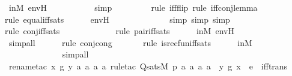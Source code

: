 \begin{isabellebody}
\ inM\ envH\ \isanewline
\ \ \ \ \ \ \ \ \isamarkupfalse%
\ simp\ \isanewline
\ \ \ \ \ \ \ \isamarkupfalse%
{\isacharparenleft}{\kern0pt}rule\ iff{\isacharunderscore}{\kern0pt}flip{\isacharcomma}{\kern0pt}\ rule\ iff{\isacharunderscore}{\kern0pt}conj{\isacharunderscore}{\kern0pt}lemma{\isacharparenright}{\kern0pt}\isanewline
\ \ \ \ \ \ \ \ \ \isamarkupfalse%
{\isacharparenleft}{\kern0pt}rule\ equal{\isacharunderscore}{\kern0pt}iff{\isacharunderscore}{\kern0pt}sats{\isacharparenright}{\kern0pt}\isanewline
\ \ \ \ \isamarkupfalse%
\ envH\ \isanewline
\ \ \ \ \ \ \ \ \ \ \ \isamarkupfalse%
\ {\isacharparenleft}{\kern0pt}simp{\isacharcomma}{\kern0pt}\ simp{\isacharcomma}{\kern0pt}\ simp{\isacharparenright}{\kern0pt}\isanewline
\ \ \ \ \ \ \ \isamarkupfalse%
{\isacharparenleft}{\kern0pt}rule\ conj{\isacharunderscore}{\kern0pt}iff{\isacharunderscore}{\kern0pt}sats{\isacharparenright}{\kern0pt}\ \isanewline
\ \ \ \ \ \ \ \ \ \ \isamarkupfalse%
\ {\isacharparenleft}{\kern0pt}rule\ pair{\isacharunderscore}{\kern0pt}iff{\isacharunderscore}{\kern0pt}sats{\isacharparenright}{\kern0pt}\isanewline
\ \ \ \ \isamarkupfalse%
\ inM\ envH\ \isanewline
\ \ \ \ \ \ \ \ \ \ \ \ \ \ \isamarkupfalse%
\ {\isacharparenleft}{\kern0pt}simp{\isacharunderscore}{\kern0pt}all{\isacharparenright}{\kern0pt}\isanewline
\ \ \ \ \isamarkupfalse%
\ {\isacharparenleft}{\kern0pt}rule\ conj{\isacharunderscore}{\kern0pt}cong{\isacharparenright}{\kern0pt}\isanewline
\ \ \ \ \ \isamarkupfalse%
\ {\isacharparenleft}{\kern0pt}rule\ is{\isacharunderscore}{\kern0pt}recfun{\isacharunderscore}{\kern0pt}iff{\isacharunderscore}{\kern0pt}sats{\isacharparenright}{\kern0pt}\isanewline
\ \ \ \ \isamarkupfalse%
\ inM\ \isanewline
\ \ \ \ \ \ \ \ \ \ \ \ \isamarkupfalse%
\ {\isacharparenleft}{\kern0pt}simp{\isacharunderscore}{\kern0pt}all{\isacharparenright}{\kern0pt}\isanewline
\ \ \ \ \ \isamarkupfalse%
\ {\isacharparenleft}{\kern0pt}rename{\isacharunderscore}{\kern0pt}tac\ x{\isacharprime}{\kern0pt}\ g\ y\ a{}\ a{}\ a{}\ a{}{\isacharcomma}{\kern0pt}\ rule{\isacharunderscore}{\kern0pt}tac\ Q{\isacharequal}{\kern0pt}{\isachardoublequoteopen}sats{\isacharparenleft}{\kern0pt}M{\isacharcomma}{\kern0pt}\ p{\isacharcomma}{\kern0pt}\ {\isacharbrackleft}{\kern0pt}a{}{\isacharcomma}{\kern0pt}\ a{}{\isacharcomma}{\kern0pt}\ a{}{\isacharcomma}{\kern0pt}\ a{}{\isacharbrackright}{\kern0pt}\ {\isacharat}{\kern0pt}\ {\isacharparenleft}{\kern0pt}{\isacharbrackleft}{\kern0pt}y{\isacharcomma}{\kern0pt}\ g{\isacharcomma}{\kern0pt}\ x{\isacharprime}{\kern0pt}{\isacharbrackright}{\kern0pt}\ {\isacharat}{\kern0pt}\ e{\isacharparenright}{\kern0pt}{\isacharparenright}{\kern0pt}{\isachardoublequoteclose}\ \ iff{\isacharunderscore}{\kern0pt}trans{\isacharparenright}{\kern0pt}\isanewline

\end{isabellebody}
